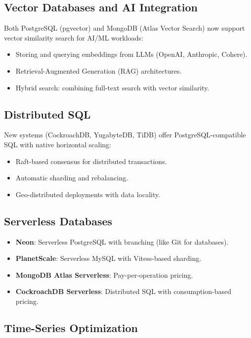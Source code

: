 \documentclass[12pt,a4paper]{article}
\begin{document}
\subsection{Vector Databases and AI Integration}

Both PostgreSQL (pgvector) and MongoDB (Atlas Vector Search) now support vector similarity search for AI/ML workloads:
\begin{itemize}
    \item Storing and querying embeddings from LLMs (OpenAI, Anthropic, Cohere).
    \item Retrieval-Augmented Generation (RAG) architectures.
    \item Hybrid search: combining full-text search with vector similarity.
\end{itemize}

\subsection{Distributed SQL}

New systems (CockroachDB, YugabyteDB, TiDB) offer PostgreSQL-compatible SQL with native horizontal scaling:
\begin{itemize}
    \item Raft-based consensus for distributed transactions.
    \item Automatic sharding and rebalancing.
    \item Geo-distributed deployments with data locality.
\end{itemize}

\subsection{Serverless Databases}

\begin{itemize}
    \item \textbf{Neon}: Serverless PostgreSQL with branching (like Git for databases).
    \item \textbf{PlanetScale}: Serverless MySQL with Vitess-based sharding.
    \item \textbf{MongoDB Atlas Serverless}: Pay-per-operation pricing.
    \item \textbf{CockroachDB Serverless}: Distributed SQL with consumption-based pricing.
\end{itemize}

\subsection{Time-Series Optimization}
\end{document}
